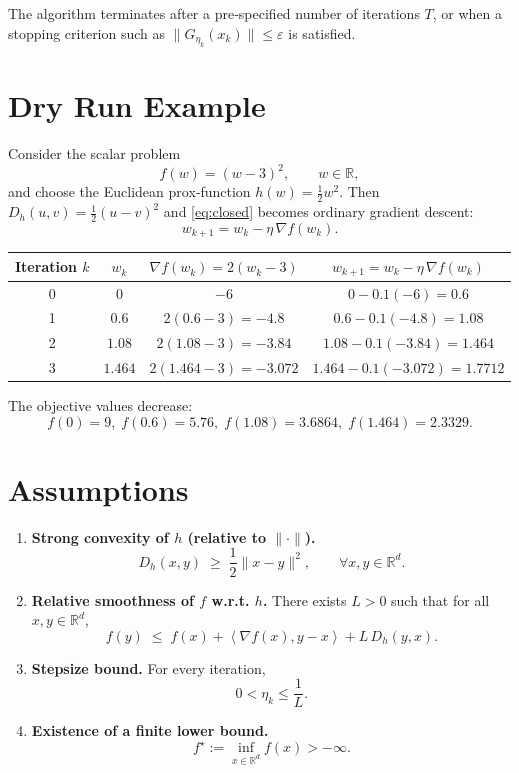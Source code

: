 \documentclass{article}
\newcommand{\grad}{\nabla}
\newcommand{\Dh}{D_h}
\newcommand{\R}{\mathbb{R}}
\newcommand{\inner}[2]{\left\langle #1,#2\right\rangle}
\begin{document}
The algorithm terminates after a pre‑specified number of iterations $T$, or when a stopping criterion such as $\|G_{\eta_k}(x_k)\|\le\varepsilon$ is satisfied.

\section*{Dry Run Example}
Consider the scalar problem
\[
f(w)=(w-3)^{2},\qquad w\in\R,
\]
and choose the Euclidean prox‑function $h(w)=\tfrac12 w^{2}$. Then $\Dh(u,v)=\tfrac12 (u-v)^{2}$ and \eqref{eq:closed} becomes ordinary gradient descent:
\[
w_{k+1}=w_k-\eta\,\grad f(w_k).
\]

\begin{center}
\begin{tabular}{c|c|c|c}
Iteration $k$ & $w_k$ & $\grad f(w_k)=2(w_k-3)$ & $w_{k+1}=w_k-\eta\,\grad f(w_k)$\\\hline
0 & $0$ & $-6$ & $0-0.1(-6)=0.6$\\
1 & $0.6$ & $2(0.6-3)=-4.8$ & $0.6-0.1(-4.8)=1.08$\\
2 & $1.08$ & $2(1.08-3)=-3.84$ & $1.08-0.1(-3.84)=1.464$\\
3 & $1.464$ & $2(1.464-3)=-3.072$ & $1.464-0.1(-3.072)=1.7712$
\end{tabular}
\end{center}
The objective values decrease:
\[
f(0)=9,\; f(0.6)=5.76,\; f(1.08)=3.6864,\; f(1.464)=2.3329.
\]

\section*{Assumptions}
\begin{enumerate}
\item \textbf{Strong convexity of $h$ (relative to $\|\cdot\|$).}
\[
\Dh(x,y)\;\ge\;\frac{1}{2}\|x-y\|^{2},\qquad\forall x,y\in\R^{d}. \tag{A1}
\]

\item \textbf{Relative smoothness of $f$ w.r.t. $h$.}
There exists $L>0$ such that for all $x,y\in\R^{d}$,
\[
f(y)\;\le\; f(x)+\inner{\grad f(x)}{y-x}+L\,\Dh(y,x). \tag{A2}
\]

\item \textbf{Stepsize bound.}
For every iteration,
\[
0<\eta_k\le\frac{1}{L}. \tag{A3}
\]

\item \textbf{Existence of a finite lower bound.}
\[
f^{\star}:=\inf_{x\in\R^{d}} f(x) > -\infty. \tag{A4}
\]
\end{enumerate}
\end{document}
